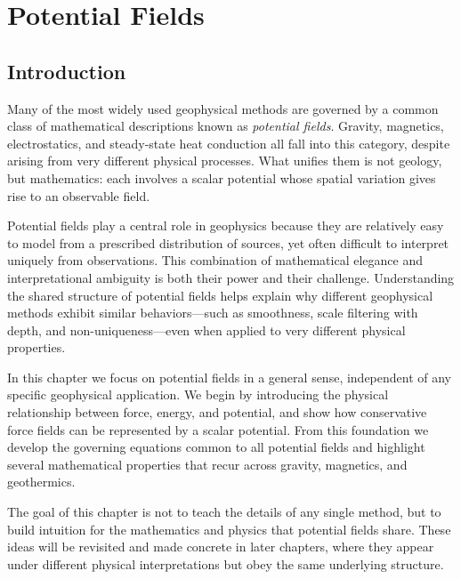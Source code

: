 \chapter{Potential Fields} \label{ch:potential}
\section{Introduction}
Many of the most widely used geophysical methods are governed by a common class of mathematical descriptions known as \emph{potential fields}. Gravity, magnetics, electrostatics, and steady-state heat conduction all fall into this category, despite arising from very different physical processes. What unifies them is not geology, but mathematics: each involves a scalar potential whose spatial variation gives rise to an observable field.

Potential fields play a central role in geophysics because they are relatively easy to model from a prescribed distribution of sources, yet often difficult to interpret uniquely from observations. This combination of mathematical elegance and interpretational ambiguity is both their power and their challenge. Understanding the shared structure of potential fields helps explain why different geophysical methods exhibit similar behaviors---such as smoothness, scale filtering with depth, and non-uniqueness---even when applied to very different physical properties.

In this chapter we focus on potential fields in a general sense, independent of any specific geophysical application. We begin by introducing the physical relationship between force, energy, and potential, and show how conservative force fields can be represented by a scalar potential. From this foundation we develop the governing equations common to all potential fields and highlight several mathematical properties that recur across gravity, magnetics, and geothermics.

The goal of this chapter is not to teach the details of any single method, but to build intuition for the mathematics and physics that potential fields share. These ideas will be revisited and made concrete in later chapters, where they appear under different physical interpretations but obey the same underlying structure.

